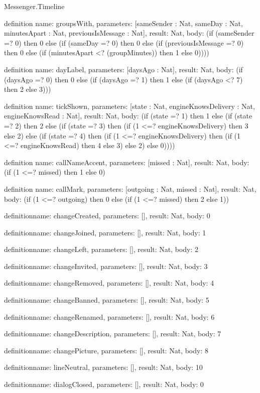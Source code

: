 \begin{lexlean}{Messenger.Timeline}
\begin{semanticmodule}
definition{
  name: groupsWith,
  parameters: [sameSender : Nat, sameDay : Nat, minutesApart : Nat, previousIsMessage : Nat],
  result: Nat,
  body: (if (sameSender =? 0) then 0 else (if (sameDay =? 0) then 0 else (if (previousIsMessage =? 0) then 0 else (if (minutesApart <? (groupMinutes)) then 1 else 0))))
}

definition{
  name: dayLabel,
  parameters: [daysAgo : Nat],
  result: Nat,
  body: (if (daysAgo =? 0) then 0 else (if (daysAgo =? 1) then 1 else (if (daysAgo <? 7) then 2 else 3)))
}

definition{
  name: tickShown,
  parameters: [state : Nat, engineKnowsDelivery : Nat, engineKnowsRead : Nat],
  result: Nat,
  body: (if (state =? 1) then 1 else (if (state =? 2) then 2 else (if (state =? 3) then (if (1 <=? engineKnowsDelivery) then 3 else 2) else (if (state =? 4) then (if (1 <=? engineKnowsDelivery) then (if (1 <=? engineKnowsRead) then 4 else 3) else 2) else 0))))
}

definition{
  name: callNameAccent,
  parameters: [missed : Nat],
  result: Nat,
  body: (if (1 <=? missed) then 1 else 0)
}

definition{
  name: callMark,
  parameters: [outgoing : Nat, missed : Nat],
  result: Nat,
  body: (if (1 <=? outgoing) then 0 else (if (1 <=? missed) then 2 else 1))
}

definition{name: changeCreated, parameters: [], result: Nat, body: 0}

definition{name: changeJoined, parameters: [], result: Nat, body: 1}

definition{name: changeLeft, parameters: [], result: Nat, body: 2}

definition{name: changeInvited, parameters: [], result: Nat, body: 3}

definition{name: changeRemoved, parameters: [], result: Nat, body: 4}

definition{name: changeBanned, parameters: [], result: Nat, body: 5}

definition{name: changeRenamed, parameters: [], result: Nat, body: 6}

definition{name: changeDescription, parameters: [], result: Nat, body: 7}

definition{name: changePicture, parameters: [], result: Nat, body: 8}

definition{name: lineNeutral, parameters: [], result: Nat, body: 10}

definition{name: dialogClosed, parameters: [], result: Nat, body: 0}


\end{semanticmodule}
\end{lexlean}
